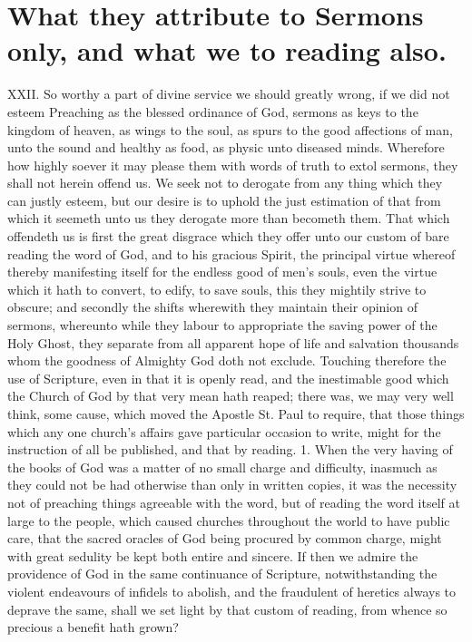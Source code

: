 \section*{What they attribute to Sermons only, and what we to reading also.}
XXII. So worthy a part of divine service we should greatly wrong, if we did not esteem Preaching as the blessed ordinance of God, sermons as keys to the kingdom of heaven, as wings to the soul, as spurs to the good affections of man, unto the sound and healthy as food, as physic unto diseased minds. Wherefore how highly soever it may please them with words of truth to extol sermons, they shall not herein offend us. We seek not to derogate from any thing which they can justly esteem, but our desire is to uphold the just estimation of that from which it seemeth unto us they derogate more than becometh them. That which offendeth us is first the great disgrace which they offer unto our custom of bare reading the word of God, and to his gracious Spirit, the principal virtue whereof thereby manifesting itself for the endless good of men’s souls, even the virtue which it hath to convert, to edify, to save souls, this they mightily strive to obscure; and secondly the shifts wherewith they maintain their opinion of sermons, whereunto while they labour to appropriate the saving power of the Holy Ghost, they separate from all apparent hope of life and salvation thousands whom the goodness of Almighty God doth not exclude.
Touching therefore the use of Scripture, even in that it is openly read, and the inestimable good which the Church of God by that very mean hath reaped; there was, we may very well think, some cause, which moved the Apostle St. Paul to require, that those things which any one church’s  affairs gave particular occasion to write, might for the instruction of all be published, and that by reading.
1. When the very having of the books of God was a matter of no small charge and difficulty, inasmuch as they could not be had otherwise than only in written copies, it was the necessity not of preaching things agreeable with the word, but of reading the word itself at large to the people, which caused churches throughout the world to have public care, that the sacred oracles of God being procured by common charge, might with great sedulity be kept both entire and sincere. If then we admire the providence of God in the same continuance of Scripture, notwithstanding the violent endeavours of infidels to abolish, and the fraudulent of heretics always to deprave the same, shall we set light by that custom of reading, from whence so precious a benefit hath grown?
